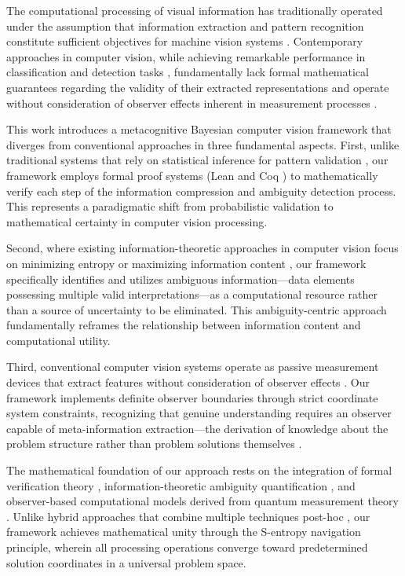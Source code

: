 \documentclass[11pt,a4paper]{article}
\begin{document}
The computational processing of visual information has traditionally operated under the assumption that information extraction and pattern recognition constitute sufficient objectives for machine vision systems \cite{szelisky2010computer, forsyth2011computer}. Contemporary approaches in computer vision, while achieving remarkable performance in classification and detection tasks \cite{krizhevsky2012imagenet, he2016deep}, fundamentally lack formal mathematical guarantees regarding the validity of their extracted representations and operate without consideration of observer effects inherent in measurement processes \cite{von2018mathematical}.

This work introduces a metacognitive Bayesian computer vision framework that diverges from conventional approaches in three fundamental aspects. First, unlike traditional systems that rely on statistical inference for pattern validation \cite{bishop2006pattern, murphy2012machine}, our framework employs formal proof systems (Lean \cite{moura2015lean} and Coq \cite{bertot2013interactive}) to mathematically verify each step of the information compression and ambiguity detection process. This represents a paradigmatic shift from probabilistic validation to mathematical certainty in computer vision processing.

Second, where existing information-theoretic approaches in computer vision focus on minimizing entropy or maximizing information content \cite{cover2006elements, mackay2003information}, our framework specifically identifies and utilizes ambiguous information—data elements possessing multiple valid interpretations—as a computational resource rather than a source of uncertainty to be eliminated. This ambiguity-centric approach fundamentally reframes the relationship between information content and computational utility.

Third, conventional computer vision systems operate as passive measurement devices that extract features without consideration of observer effects \cite{ballard1991animate, aloimonos1988active}. Our framework implements definite observer boundaries through strict coordinate system constraints, recognizing that genuine understanding requires an observer capable of meta-information extraction—the derivation of knowledge about the problem structure rather than problem solutions themselves \cite{hofstadter2007strange}.

The mathematical foundation of our approach rests on the integration of formal verification theory \cite{harrison2009handbook}, information-theoretic ambiguity quantification \cite{shannon1948mathematical}, and observer-based computational models derived from quantum measurement theory \cite{wheeler1983quantum, zurek2003decoherence}. Unlike hybrid approaches that combine multiple techniques post-hoc \cite{ensemble2012zhou}, our framework achieves mathematical unity through the S-entropy navigation principle, wherein all processing operations converge toward predetermined solution coordinates in a universal problem space.
\end{document}
